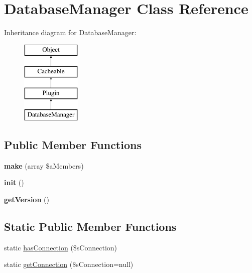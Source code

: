 \hypertarget{class_database_manager}{\section{Database\-Manager Class Reference}
\label{class_database_manager}
}
Inheritance diagram for Database\-Manager\-:\begin{figure}[H]
\begin{center}
\leavevmode
\includegraphics[height=4.000000cm]{class_database_manager}
\end{center}
\end{figure}
\subsection*{Public Member Functions}
\begin{DoxyCompactItemize}
\item 
\hypertarget{class_database_manager_aaddc4164521431597c6b163c41a5f8c0}{{\bfseries make} (array \$a\-Members)}\label{class_database_manager_aaddc4164521431597c6b163c41a5f8c0}

\item 
\hypertarget{class_database_manager_af6c7f33a2323eaf0a7186548e4757fe2}{{\bfseries init} ()}\label{class_database_manager_af6c7f33a2323eaf0a7186548e4757fe2}

\item 
\hypertarget{class_database_manager_a6e2a2d66583f910b8609703777fa8473}{{\bfseries get\-Version} ()}\label{class_database_manager_a6e2a2d66583f910b8609703777fa8473}

\end{DoxyCompactItemize}
\subsection*{Static Public Member Functions}
\begin{DoxyCompactItemize}
\item 
static \hyperlink{class_database_manager_a3c1ff1d699840f49ef7677031640d376}{has\-Connection} (\$s\-Connection)
\item 
static \hyperlink{class_database_manager_a515610c5c948cab3bc18b3cb0aecd983}{get\-Connection} (\$s\-Connection=null)
\end{DoxyCompactItemize}


